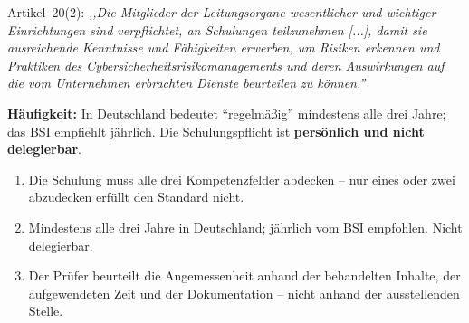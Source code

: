 \documentclass[11pt,a4paper,twoside]{book}
\begin{document}
Artikel~20(2): \textit{,,Die Mitglieder der Leitungsorgane wesentlicher und wichtiger Einrichtungen sind verpflichtet, an Schulungen teilzunehmen [...], damit sie ausreichende Kenntnisse und Fähigkeiten erwerben, um Risiken erkennen und Praktiken des Cybersicherheitsrisikomanagements und deren Auswirkungen auf die vom Unternehmen erbrachten Dienste beurteilen zu können.''}

\begin{center}
\par\smallskip{}
\end{center}

\textbf{Häufigkeit:} In Deutschland bedeutet ``regelmäßig'' mindestens alle drei Jahre; das BSI empfiehlt jährlich. Die Schulungspflicht ist \textbf{persönlich und nicht delegierbar}.

\begin{keytakeaways}
\begin{enumerate}
  \item Die Schulung muss alle drei Kompetenzfelder abdecken -- nur eines oder zwei abzudecken erfüllt den Standard nicht.
  \item Mindestens alle drei Jahre in Deutschland; jährlich vom BSI empfohlen. Nicht delegierbar.
  \item Der Prüfer beurteilt die Angemessenheit anhand der behandelten Inhalte, der aufgewendeten Zeit und der Dokumentation -- nicht anhand der ausstellenden Stelle.
\end{enumerate}
\end{keytakeaways}
\end{document}
